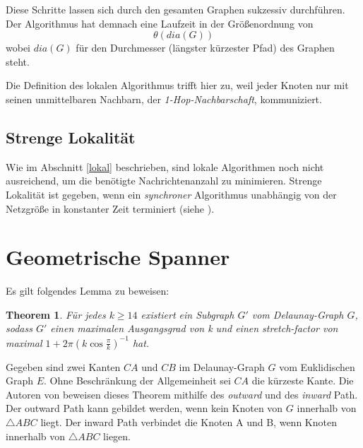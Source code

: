 \documentclass[a4paper,twoside]{IEEEtran}
\newtheorem{boundedSpannerTheorem}{Theorem}[section]
\begin{document}
Diese Schritte lassen sich durch den gesamten Graphen sukzessiv durchführen. 
Der Algorithmus hat demnach eine Laufzeit in der Größenordnung von 
\begin{equation*}
\theta (dia(G)) 
\end{equation*}
wobei $dia(G) $ für den Durchmesser (längster kürzester Pfad) des Graphen steht.

Die Definition des lokalen Algorithmus trifft hier zu, weil jeder Knoten nur mit seinen unmittelbaren Nachbarn, der \textit{1-Hop-Nachbarschaft}, kommuniziert.





\subsection{Strenge Lokalität}
Wie im Abschnitt \ref{lokal} beschrieben, sind lokale Algorithmen noch nicht ausreichend, um die benötigte Nachrichtenanzahl zu minimieren.
Strenge Lokalität ist gegeben, wenn ein \textit{synchroner} Algorithmus unabhängig von der Netzgröße in konstanter Zeit terminiert (siehe \cite{strictlyLocal}).




\section{Geometrische Spanner}

Es gilt folgendes Lemma zu beweisen:

\begin{boundedSpannerTheorem}
Für jedes $k \geq 14 $ existiert ein Subgraph $G' $ vom Delaunay-Graph $G $, sodass $G' $ einen maximalen Ausgangsgrad von k und einen stretch-factor von maximal $1+2\pi(k \cos{\frac{\pi}{k}})^{-1} $ hat.
\end{boundedSpannerTheorem}
Gegeben sind zwei Kanten $CA $ und $CB $ im Delaunay-Graph $G $ vom Euklidischen Graph $E $.
Ohne Beschränkung der Allgemeinheit sei $CA $ die kürzeste Kante.
Die Autoren von \cite{kanj} beweisen dieses Theorem mithilfe des \textit{outward} und des \textit{inward} Path. %
Der outward Path kann gebildet werden, wenn kein Knoten von $G $ innerhalb von $\triangle {ABC} $ liegt.
Der inward Path verbindet die Knoten A und B, wenn Knoten innerhalb von $\triangle {ABC} $ liegen.
\end{document}
